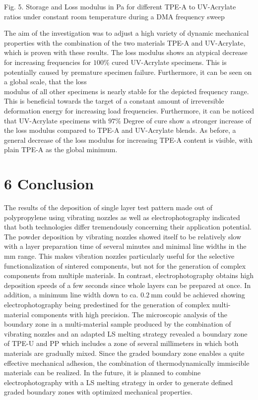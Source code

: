\documentclass[10pt]{article}
\begin{document}
Fig. 5. Storage and Loss modulus in Pa for different TPE-A to UV-Acrylate ratios under constant room temperature during a DMA frequency sweep

The aim of the investigation was to adjust a high variety of dynamic mechanical properties with the combination of the two materials TPE-A and UV-Acrylate, which is proven with these results. The loss modulus shows an atypical decrease for increasing frequencies for $100 \%$ cured UV-Acrylate specimens. This is potentially caused by premature specimen failure. Furthermore, it can be seen on a global scale, that the loss\\
modulus of all other specimens is nearly stable for the depicted frequency range. This is beneficial towards the target of a constant amount of irreversible deformation energy for increasing load frequencies. Furthermore, it can be noticed that UV-Acrylate specimens with $97 \%$ Degree of cure show a stronger increase of the loss modulus compared to TPE-A and UV-Acrylate blends. As before, a general decrease of the loss modulus for increasing TPE-A content is visible, with plain TPE-A as the global minimum.

\section*{6 Conclusion}
The results of the deposition of single layer test pattern made out of polypropylene using vibrating nozzles as well as electrophotography indicated that both technologies differ tremendously concerning their application potential. The powder deposition by vibrating nozzles showed itself to be relatively slow with a layer preparation time of several minutes and minimal line widths in the $\mathrm{mm}$ range. This makes vibration nozzles particularly useful for the selective functionalization of sintered components, but not for the generation of complex components from multiple materials. In contrast, electrophotography obtains high deposition speeds of a few seconds since whole layers can be prepared at once. In addition, a minimum line width down to ca. $0.2 \mathrm{~mm}$ could be achieved showing electrophotography being predestined for the generation of complex multi-material components with high precision. The microscopic analysis of the boundary zone in a multi-material sample produced by the combination of vibrating nozzles and an adapted LS melting strategy revealed a boundary zone of TPE-U and PP which includes a zone of several millimeters in which both materials are gradually mixed. Since the graded boundary zone enables a quite effective mechanical adhesion, the combination of thermodynamically immiscible materials can be realized. In the future, it is planned to combine electrophotography with a LS melting strategy in order to generate defined graded boundary zones with optimized mechanical properties.
\end{document}
